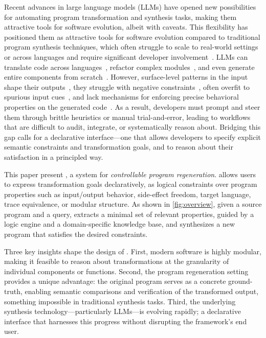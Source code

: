 \documentclass[a4paper,twoside,12pt]{report} %
\begin{document}
Recent advances in large language models (LLMs) have opened new possibilities for automating program transformation and synthesis tasks, making them attractive tools for software evolution, albeit with caveats.
This flexibility has positioned them as attractive tools for software evolution
compared to traditional program synthesis techniques, which often struggle
to scale to real-world settings or across languages and require significant developer involvement~\cite{reynolds2019syguscomp,leino2016dafny,wu2023programming,dynamoth2016,cambronero2019active}.
LLMs can translate code across languages~\cite{ou2025enhancingllmbasedcodetranslation},
refactor complex modules~\cite{ziftci2025migrating},
and even generate entire components from scratch~\cite{huynh2025largelanguagemodelscode}.
However, surface-level patterns in the input shape their outputs~\cite{yang2025evaluatinggeneralizationcapabilitieslarge},
they struggle with negative constraints~\cite{hwang2024thinkpinkelephant,jiang2024llmsdreamelephantswhen},
often overfit to spurious input cues~\cite{xu2023llmfoolitselfpromptbased, wu2023deceptpromptexploitingllmdrivencode},
and lack mechanisms for enforcing precise behavioral properties on the generated code~\cite{roh2025breakthechainreasoningfailuresllms}.
As a result, developers must prompt and steer them through brittle heuristics or manual trial-and-error, leading to workflows that are difficult to audit, integrate, or systematically reason about.
Bridging this gap calls for a declarative interface---one that allows developers to specify explicit semantic constraints and transformation goals, and to reason about their satisfaction in a principled way.

This paper present \sys, a system for \emph{controllable program regeneration}.
\sys allows users
to express transformation goals declaratively, as logical constraints over
program properties such as input/output behavior, side-effect freedom, target
language, trace equivalence, or modular structure.
As shown in \cref{fig:overview}, given a source program and
a query, \sys extracts a minimal set of relevant properties, guided by a
logic engine and a domain-specific knowledge base, and synthesizes a new
program that satisfies the desired constraints.

Three key insights shape the design of \sys.
First, modern software is highly modular, making it feasible to reason about transformations at the granularity of individual components or functions.
Second, the program regeneration setting provides a unique advantage: the original program serves as a concrete ground-truth, enabling semantic comparisons and verification of the transformed output, something impossible in traditional synthesis tasks.
Third, the underlying synthesis technology---particularly LLMs---is evolving rapidly; a declarative interface that harnesses this progress without disrupting the framework's end user.
\end{document}
